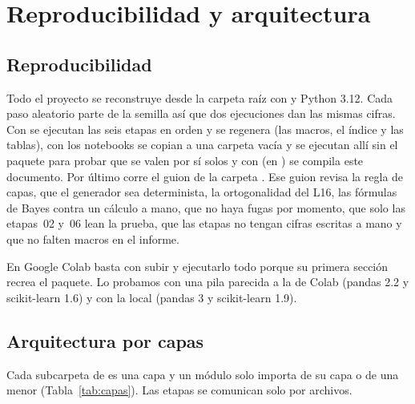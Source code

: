 \section{Reproducibilidad y arquitectura}
\label{sec:apendice}

\subsection{Reproducibilidad}

Todo el proyecto se reconstruye desde la carpeta raíz con  y
Python 3.12. Cada paso aleatorio parte de la semilla \DatSemilla{} así que
dos ejecuciones dan las mismas cifras. Con  se ejecutan las seis
etapas en orden y se regenera  (las macros, el
índice y las tablas), con  los notebooks se copian a una
carpeta vacía y se ejecutan allí sin el paquete para probar que se valen por
sí solos y con  (en ) se compila este
documento. Por último  corre el guion
 de la carpeta . Ese guion revisa
la regla de capas, que el generador sea determinista, la ortogonalidad del
L16, las fórmulas de Bayes contra un cálculo a mano, que no haya fugas por
momento, que solo las etapas~02 y~06 lean la prueba, que las etapas no tengan cifras
escritas a mano y que no falten macros en el informe.

En Google Colab basta con subir  y
ejecutarlo todo porque su primera sección recrea el paquete. Lo probamos con
una pila parecida a la de Colab (pandas 2.2 y scikit-learn 1.6) y con la local
(pandas 3 y scikit-learn 1.9).

\subsection{Arquitectura por capas}

Cada subcarpeta de  es una capa y un módulo solo importa de
su capa o de una menor (Tabla~\ref{tab:capas}). Las etapas se comunican solo
por archivos.

